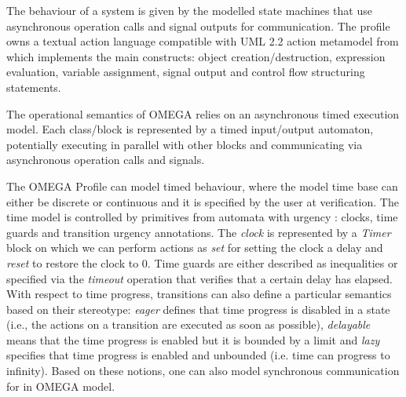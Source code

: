 \documentclass[a4paper,twoside]{article}
\def\uml{\textsc{UML}}
\begin{document}

The behaviour of a system is given by the modelled state machines that use asynchronous operation calls and signal outputs for communication. The profile owns a textual action language compatible with \uml{} 2.2 action metamodel from which implements the main constructs: object creation/destruction, expression evaluation, variable assignment, signal output and control flow structuring statements.


The operational semantics of OMEGA relies on an asynchronous timed execution model. Each class/block is represented by a timed input/output automaton, potentially executing in parallel with other blocks and communicating via asynchronous operation calls and signals. 

The OMEGA Profile can model timed behaviour, where the model time base can either be discrete or continuous and it is specified by the user at verification. The time model is controlled by primitives from automata with urgency \cite{BornotS00}: clocks, time guards and transition urgency annotations. The \textit{clock} is represented by a \textit{Timer} block on which we can perform actions as \textit{set} for setting the clock a delay and \textit{reset} to restore the clock to 0. Time guards are either described as inequalities or specified via the \textit{timeout} operation  that verifies that a certain delay has elapsed. With respect to time progress, transitions can also define a particular semantics based on their stereotype: \textit{eager} defines that time progress is disabled in a state (i.e., the actions on a transition are executed as soon as possible), \textit{delayable} means that the time progress is enabled but it is bounded by a limit and \textit{lazy} specifies that time progress is enabled and unbounded (i.e. time can progress to infinity). Based on these notions, one can also model synchronous communication for in OMEGA model.

\end{document}
